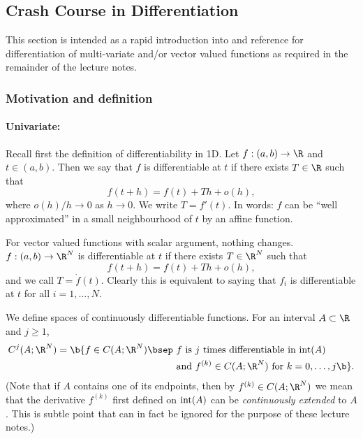 \subsection{Crash Course in Differentiation}


This section is intended as a rapid introduction into and reference
for differentiation of multi-variate and/or vector valued functions as
required in the remainder of the lecture notes.

\subsubsection{Motivation and definition}
%
\paragraph{Univariate:}
%
Recall first the definition of differentiability in 1D. Let $f : (a,
b) \to \R$ and $t \in (a, b)$. Then we say that $f$ is differentiable
at $t$ if there exists $T \in \R$ such that
\begin{displaymath}
  f(t+h) = f(t) + T h + o(h),
\end{displaymath}
where $o(h) / h \to 0$ as $h \to 0$. We write $T = f'(t)$. In words:
$f$ can be ``well approximated'' in a small neighbourhood of $t$ by an
affine function.

For vector valued functions with scalar argument, nothing changes. $f
: (a, b) \to \R^N$ is differentiable at $t$ if there exists $T \in
\R^N$ such that
\begin{displaymath}
  f(t+h) = f(t) + T h + o(h),
\end{displaymath}
and we call $T = \dot{f}(t)$. Clearly this is equivalent to saying
that $f_i$ is differentiable at $t$ for all $i = 1, \dots, N$.

We define spaces of continuously differentiable functions. For an
interval $A \subset \R$ and $j \geq 1$,
\begin{align*}
  C^j(A;\R^N) = \b\{ f \in C(A;\R^N) \bsep & \text{ $f$ is $j$ times
    differentiable in ${\rm int}(A)$} \\
  & \text{ and $f^{(k)} \in C(A;\R^N)$ for $k = 0, \dots, j$} \b\}.
\end{align*}
(Note that if $A$ contains one of its endpoints, then by $f^{(k)} \in
C(A; \R^N)$ we mean that the derivative $f^{(k)}$ first defined on
${\rm int}(A)$ can be {\em continuously extended} to $A$. This is
subtle point that can in fact be ignored for the purpose of these
lecture notes.)



